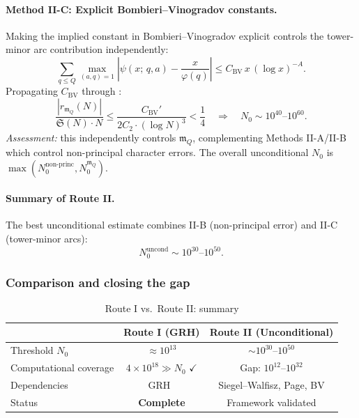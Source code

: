 \documentclass[11pt,a4paper]{article}
\theoremstyle{remark}
\newcommand{\mm}{\mathfrak{m}}
\begin{document}
\paragraph{Method II-C: Explicit Bombieri--Vinogradov constants.}
Making the implied constant in Bombieri--Vinogradov explicit controls
the tower-minor arc contribution independently:
\begin{equation}
\label{eq:explicit-bv}
  \sum_{q \leq Q}\max_{(a,q)=1}\left|\psi(x;\,q,a) - \frac{x}{\varphi(q)}\right|
    \leq C_{\text{BV}}\, x\, (\log x)^{-A}.
\end{equation}
Propagating $C_{\text{BV}}$ through :
\begin{equation}
\label{eq:methodC-N0}
  \frac{|r_{\mm_Q}(N)|}{\mathfrak{S}(N)\cdot N}
    \leq \frac{C_{\text{BV}}'}{2C_2\cdot(\log N)^3} < \frac{1}{4}
  \quad\Longrightarrow\quad N_0 \sim 10^{40}\text{--}10^{60}.
\end{equation}
\emph{Assessment:} this independently controls $\mm_Q$, complementing
Methods II-A/II-B which control non-principal character errors.  The
overall unconditional $N_0$ is
$\max(N_0^{\text{non-princ}}, N_0^{\mm_Q})$.

\paragraph{Summary of Route II.}
The best unconditional estimate combines II-B (non-principal error)
and II-C (tower-minor arcs):
\begin{equation}
\label{eq:routeII-N0}
  N_0^{\text{uncond}} \sim 10^{30}\text{--}10^{50}.
\end{equation}

\subsubsection{Comparison and closing the gap}

\begin{table}[ht]
\centering
\caption{Route I vs.\ Route II: summary}
\label{tab:route-comparison}
\small
\renewcommand{\arraystretch}{1.3}
\begin{tabular}{@{}lcc@{}}
\toprule
 & \textbf{Route I (GRH)} & \textbf{Route II (Unconditional)} \\
\midrule
Threshold $N_0$ & $\approx 10^{13}$ & $\sim 10^{30}$--$10^{50}$ \\
Computational coverage & $4\times 10^{18} \gg N_0$ \quad$\checkmark$ & Gap: $10^{12}$--$10^{32}$ \\
Dependencies & GRH~\cite{Chen2026GRH} & Siegel--Walfisz, Page, BV \\
Status & \textbf{Complete} & Framework validated \\
\bottomrule
\end{tabular}
\end{table}
\end{document}
